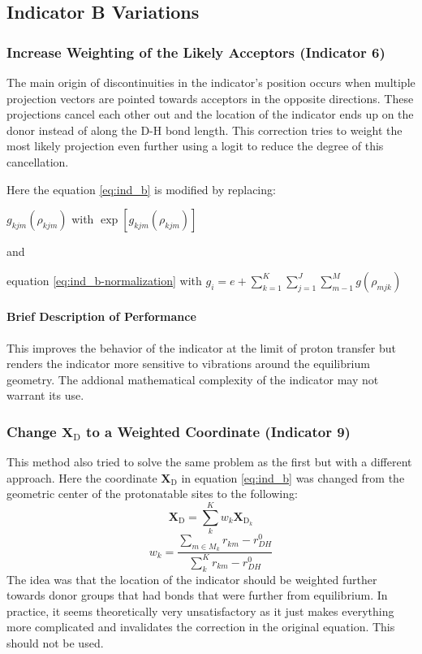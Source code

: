 \documentclass{article}
\newcommand{\mb}[1]{\mathbf{#1}}
\newcommand{\mr}[1]{\mathrm{#1}}
\begin{document}
\subsection{Indicator B Variations}
\subsubsection{Increase Weighting of the Likely Acceptors (Indicator 6)}\label{ss:indicator6}
The main origin of discontinuities in the indicator's position occurs when multiple projection vectors are pointed towards acceptors in the opposite directions.
These projections cancel each other out and the location of the indicator ends up on the donor instead of along the D-H bond length.
This correction tries to weight the most likely projection even further using a logit to reduce the degree of this cancellation.

Here the equation \ref{eq:ind_b} is modified by replacing:

\begin{center}
$g_{kjm}(\rho_{kjm})$ with $\exp \left[ g_{kjm}(\rho_{kjm}) \right]$

and

equation \ref{eq:ind_b-normalization} with $g_i = e + \sum^K_{k=1} \sum^J_{j=1}   \sum^M_{m-1} g(\rho_{mjk})$
\end{center}

\paragraph{Brief Description of Performance}
This improves the behavior of the indicator at the limit of proton transfer but renders the indicator more sensitive to vibrations around the equilibrium geometry.
The addional mathematical complexity of the indicator may not warrant its use.

\subsubsection{Change $\mb{X}_{\mr{D}}$ to a Weighted Coordinate (Indicator 9)}\label{ss:indicator9}
This method also tried to solve the same problem as the first but with a different approach.
Here the coordinate $\mb{X}_{\mr{D}}$ in equation \ref{eq:ind_b} was changed from the geometric center of the protonatable sites to the following:
\begin{equation}
\mb{X}_{\mr{D}} = \sum_k^K w_k \mb{X}_{\mr{D}_k}
\end{equation}
\begin{equation}
w_k = \frac{\sum_{m \in M_k} r_{km} - r^0_{DH} }{\sum_k^K r_{km} - r^0_{DH}}
\end{equation}
The idea was that the location of the indicator should be weighted further towards donor groups that had bonds that were further from equilibrium.
In practice, it seems theoretically very unsatisfactory as it just makes everything more complicated and invalidates the correction in the original equation.
This should not be used.
\end{document}
